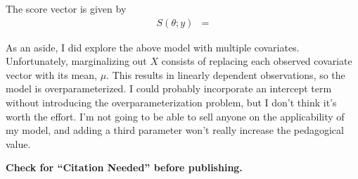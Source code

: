 \documentclass[11pt, oneside]{article}   	%
\begin{document}
\begin{appendices}
    The score vector is given by
    \begin{align}
        S(\theta; y) &= 
    \end{align}


    As an aside, I did explore the above model with multiple covariates. Unfortunately, marginalizing out $X$ consists of replacing each observed covariate vector with its mean, $\mu$. This results in linearly dependent observations, so the model is overparameterized. I could probably incorporate an intercept term without introducing the overparameterization problem, but I don't think it's worth the effort. I'm not going to be able to sell anyone on the applicability of my model, and adding a third parameter won't really increase the pedagogical value.

\end{appendices}

\textbf{Check for ``Citation Needed'' before publishing.}



\end{document}
